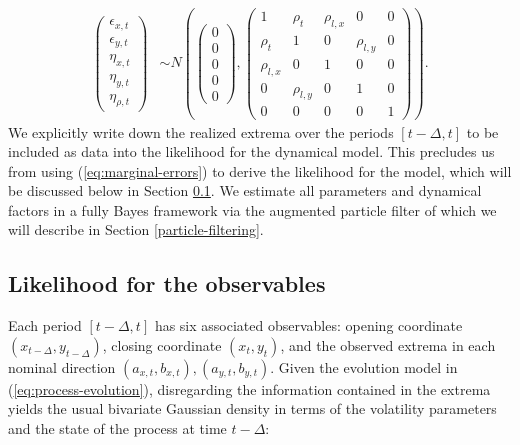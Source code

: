 \documentclass[10pt]{article}
\begin{document}
\begin{align}
  \left( \begin{array}{c}
           \epsilon_{x,t} \\
           \epsilon_{y,t} \\
           \eta_{x,t} \\
           \eta_{y,t} \\
           \eta_{\rho,t}
         \end{array} \right) &\sim N\left(
                               \left( \begin{array}{c}
                                        0\\
                                        0\\
                                        0\\
                                        0\\
                                        0
                                      \end{array} \right),
  \left( \begin{array}{ccccc}
           1 & \rho_t & \rho_{l,x} & 0 & 0 \\
           \rho_t & 1 & 0 & \rho_{l,y} & 0 \\
           \rho_{l,x} & 0 & 1 & 0 & 0 \\
           0 & \rho_{l,y} & 0 & 1 & 0 \\
           0 & 0 & 0 & 0 & 1
           \end{array} \right) \right). \label{eq:marginal-errors}
\end{align}
We explicitly write down the realized extrema over the periods
$[t-\Delta,t]$ to be included as data into the likelihood for the
dynamical model. This precludes us from using
(\ref{eq:marginal-errors}) to derive the likelihood for the model,
which will be discussed below in Section
\ref{sec:likelihood-for-obs}. We estimate all parameters and dynamical
factors in a fully Bayes framework via the augmented particle filter
of \cite{liu2001combined} which we will describe in Section
\ref{particle-filtering}.

\subsection{Likelihood for the observables} \label{sec:likelihood-for-obs}
Each period $[t-\Delta,t]$ has six associated observables: opening
coordinate $(x_{t-\Delta},y_{t-\Delta})$, closing coordinate
$(x_{t},y_{t})$, and the observed extrema in each nominal direction
$(a_{x,t}, b_{x,t}), (a_{y,t},b_{y,t})$. Given the evolution model in
(\ref{eq:process-evolution}), disregarding the information contained in
the extrema yields the usual bivariate Gaussian density in terms of
the volatility parameters and the state of the process at time $t-\Delta$:
\end{document}
